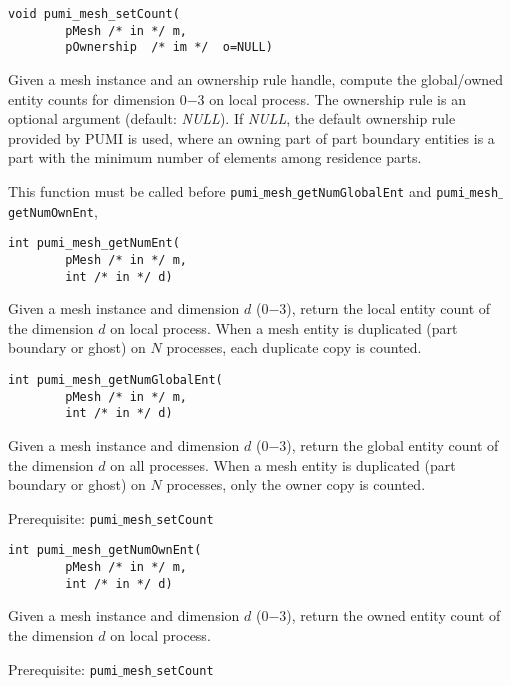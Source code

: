 \begin{verbatim}
void pumi_mesh_setCount(
        pMesh /* in */ m, 
        pOwnership  /* im */  o=NULL)
\end{verbatim}\vspace{-.5cm}\hspace{1cm}
Given a mesh instance and an ownership rule handle, compute the global/owned entity counts for dimension $0$$-$$3$ on local process. The ownership rule is an optional argument (default: \emph{NULL}). If \emph{NULL}, the default ownership rule provided by PUMI is used, where an owning part of part boundary entities is a part with the minimum number of elements among residence parts. 

This function must be called before \texttt{pumi$\_$mesh$\_$getNumGlobalEnt} and \texttt{pumi$\_$mesh$\_$getNumOwnEnt},

\begin{verbatim}
int pumi_mesh_getNumEnt(
        pMesh /* in */ m, 
        int /* in */ d)
\end{verbatim}\vspace{-.5cm}\hspace{1cm}
Given a mesh instance and dimension $d$ ($0$$-$$3$), return the local entity count of the dimension $d$ on local process. When a mesh entity is duplicated (part boundary or ghost) on $N$ processes, each duplicate copy is counted.

\begin{verbatim}
int pumi_mesh_getNumGlobalEnt(
        pMesh /* in */ m, 
        int /* in */ d)
\end{verbatim}\vspace{-.5cm}\hspace{1cm}
Given a mesh instance and dimension $d$ ($0$$-$$3$), return the global entity count of the dimension $d$ on all processes. When a mesh entity is duplicated (part boundary or ghost) on $N$ processes, only the owner copy is counted. 

Prerequisite: \texttt{pumi$\_$mesh$\_$setCount}

\begin{verbatim}
int pumi_mesh_getNumOwnEnt(
        pMesh /* in */ m, 
        int /* in */ d)
\end{verbatim}\vspace{-.5cm}\hspace{1cm}
Given a mesh instance and dimension $d$ ($0$$-$$3$), return the owned entity count of the dimension $d$ on local process. 

Prerequisite: \texttt{pumi$\_$mesh$\_$setCount}

